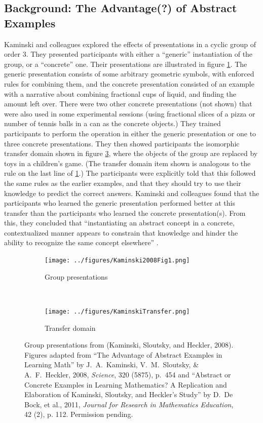 \documentclass[man,mask,10pt]{apa6}
\begin{document}
\subsection{Background: The Advantage(?) of Abstract Examples}
Kaminski and colleagues \cite{Kaminski2008} explored the effects of presentations in a cyclic group of order 3. They presented participants with either a ``generic'' instantiation of the group, or a ``concrete'' one. Their presentations are illustrated in figure \ref{kaminskitraining}. The generic presentation consists of some arbitrary geometric symbols, with enforced rules for combining them, and the concrete presentation consisted of an example with a narrative about combining fractional cups of liquid, and finding the amount left over. There were two other concrete presentations (not shown) that were also used in some experimental sessions (using fractional slices of a pizza or number of tennis balls in a can as the concrete objects.) They trained participants to perform the operation in either the generic presentation or one to three concrete presentations. They then showed participants the isomorphic transfer domain shown in figure \ref{kaminskitransfer}, where the objects of the group are replaced by toys in a children's game. (The transfer domain item shown is analogous to the rule on the last line of \ref{kaminskitraining}.) The participants were explicitly told that this followed the same rules as the earlier examples, and that they should try to use their knowledge to predict the correct answers. Kaminski and colleagues found that the participants who learned the generic presentation performed better at this transfer than the participants who learned the concrete presentation(s). From this, they concluded that ``instantiating an abstract concept in a concrete, contextualized manner appears to constrain that knowledge and hinder the ability to recognize the same concept elsewhere'' \cite{Kaminski2008}. \par
\begin{figure} \centering \begin{subfigure}{0.5\textwidth} \caption{Group presentations} \label{kaminskitraining} \texttt{[image: ../figures/Kaminski2008Fig1.png]} \end{subfigure} \\ \begin{subfigure}{0.5\textwidth} \caption{Transfer domain} \label{kaminskitransfer} \texttt{[image: ../figures/KaminskiTransfer.png]} \end{subfigure} \caption{Group presentations from (Kaminski, Sloutsky, and Heckler, 2008). Figures adapted from ``The Advantage of Abstract Examples in Learning Math'' by J.\ A.\ Kaminski, V.\ M.\ Sloutsky, \& A.\ F.\ Heckler, 2008,  \textit{Science}, 320 (5875), p.\ 454 and ``Abstract or Concrete Examples in Learning Mathematics? A Replication and Elaboration of Kaminski, Sloutsky, and Heckler's Study'' by D.\ De Bock, et al., 2011, \textit{Journal for Research in Mathematics Education}, 42 (2), p. 112.  Permission pending.} \end{figure}\noindent
\end{document}
